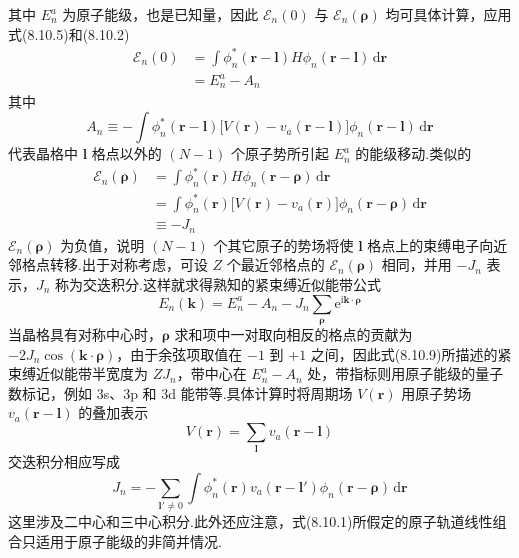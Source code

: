 其中 $E_{n}^{a}$ 为原子能级，也是已知量，因此 $\mathscr{E}_{n}(0)$ 与 $\mathscr{E}_{n}(\boldsymbol{\rho})$ 均可具体计算，应用式(8.10.5)和(8.10.2)
\begin{equation}
\begin{aligned}
  \mathscr{E}_{n}(0)
  &=\int\phi_{n}^{*}(\boldsymbol{r}-\boldsymbol{l})H\phi_{n}(\boldsymbol{r}-\boldsymbol{l})\,\mathrm{d}\boldsymbol{r}\\
  &=E_{n}^{a}-A_{n}
\end{aligned}
\end{equation}
其中
\begin{equation}
  A_{n}\equiv-\int\phi_{n}^{*}(\boldsymbol{r}-\boldsymbol{l})
  \bigl[V(\boldsymbol{r})-v_{a}(\boldsymbol{r}-\boldsymbol{l})\bigr]\phi_{n}(\boldsymbol{r}-\boldsymbol{l})\,\mathrm{d}\boldsymbol{r}
\end{equation}
代表晶格中 $\boldsymbol{l}$ 格点以外的 $(N-1)$ 个原子势所引起 $E_{n}^{a}$ 的能级移动.类似的
\begin{equation}
\begin{aligned}
  \mathscr{E}_{n}(\boldsymbol{\rho})
  &=\int\phi_{n}^{*}(\boldsymbol{r})H\phi_{n}(\boldsymbol{r}-\boldsymbol{\rho})\,\mathrm{d}\boldsymbol{r}\\
  &=\int\phi_{n}^{*}(\boldsymbol{r})\bigl[V(\boldsymbol{r})-v_{a}(\boldsymbol{r})\bigr]\phi_{n}(\boldsymbol{r}-\boldsymbol{\rho})\,\mathrm{d}\boldsymbol{r}\\
  &\equiv-J_{n}
\end{aligned}
\end{equation}
$\mathscr{E}_{n}(\boldsymbol{\rho})$ 为负值，说明 $(N-1)$ 个其它原子的势场将使 $\boldsymbol{l}$ 格点上的束缚电子向近邻格点转移.出于对称考虑，可设 $Z$ 个最近邻格点的 $\mathscr{E}_{n}(\boldsymbol{\rho})$ 相同，并用 $-J_{n}$ 表示，$J_{n}$ 称为交迭积分.这样就求得熟知的紧束缚近似能带公式
\begin{equation}
  E_{n}(\boldsymbol{k})=E_{n}^{a}-A_{n}-J_{n}\sum_{\boldsymbol{\rho}}\mathrm{e}^{\mathrm{i}\boldsymbol{k}\cdot\boldsymbol{\rho}}
\end{equation}
当晶格具有对称中心时，$\boldsymbol{\rho}$ 求和项中一对取向相反的格点的贡献为 $-2J_{n}\cos(\boldsymbol{k}\cdot\boldsymbol{\rho})$，由于余弦项取值在 $-1$ 到 $+1$ 之间，因此式(8.10.9)所描述的紧束缚近似能带半宽度为 $ZJ_{n}$，带中心在 $E_{n}^{a}-A_{n}$ 处，带指标则用原子能级的量子数标记，例如 3s、3p 和 3d 能带等.具体计算时将周期场 $V(\boldsymbol{r})$ 用原子势场 $v_{a}(\boldsymbol{r}-\boldsymbol{l})$ 的叠加表示
\begin{equation}
  V(\boldsymbol{r})=\sum_{\boldsymbol{l}}v_{a}(\boldsymbol{r}-\boldsymbol{l})
\end{equation}
交迭积分相应写成
\begin{equation}
  J_{n}=-\sum_{\boldsymbol{l}'\neq 0}\int\phi_{n}^{*}(\boldsymbol{r})v_{a}(\boldsymbol{r}-\boldsymbol{l}')\phi_{n}(\boldsymbol{r}-\boldsymbol{\rho})\,\mathrm{d}\boldsymbol{r}
\end{equation}
这里涉及二中心和三中心积分.此外还应注意，式(8.10.1)所假定的原子轨道线性组合只适用于原子能级的非简并情况.

